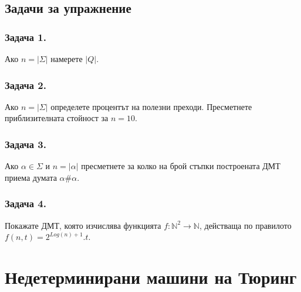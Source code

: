 \documentclass[14pt]{extarticle}
\begin{document}
\subsection*{Задачи за упражнение}

\subsubsection*{Задача 1.}
Ако \(n = |\Sigma|\) намерете \(|Q|\).

\subsubsection*{Задача 2.}
Ако \(n = |\Sigma|\) определете процентът на полезни преходи.
Пресметнете приблизителната стойност за \(n = 10\). 

\subsubsection*{Задача 3.}
Ако \(\alpha \in \Sigma\) и \(n = |\alpha|\) пресметнете за колко на брой стъпки построената ДМТ приема думата \(\alpha\#\alpha\).

\subsubsection*{Задача 4.}
Покажате ДМТ, която изчислява функцията \(f : \mathbb N^2 \to \mathbb N\), действаща по правилото \(f(n, t) = 2^{Log(n) + 1}.t\).

\newpage

\section*{Недетерминирани машини на Тюринг}
\end{document}
